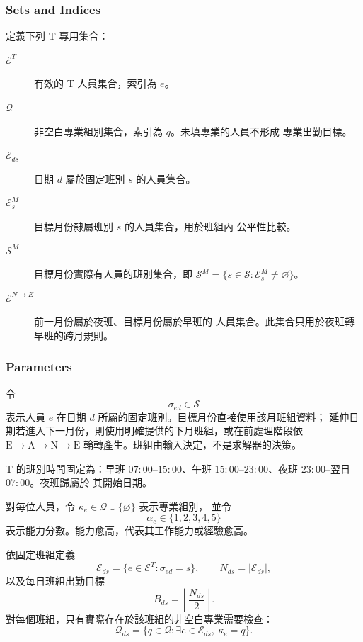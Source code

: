 \documentclass[12pt]{article}
\begin{document}
\subsubsection{Sets and Indices}

定義下列 T 專用集合：

\begin{description}
  \item[\(\mathcal{E}^{T}\)] 有效的 T 人員集合，索引為 \(e\)。

  \item[\(\mathcal{Q}\)] 非空白專業組別集合，索引為 \(q\)。未填專業的人員不形成
    專業出勤目標。

  \item[\(\mathcal{E}_{ds}\)] 日期 \(d\) 屬於固定班別 \(s\) 的人員集合。

  \item[\(\mathcal{E}^{M}_{s}\)] 目標月份隸屬班別 \(s\) 的人員集合，用於班組內
    公平性比較。

  \item[\(\mathcal{S}^{M}\)] 目標月份實際有人員的班別集合，即
    \(\mathcal{S}^{M}=\{s\in\mathcal{S}:\mathcal{E}^{M}_{s}\neq\varnothing\}\)。

  \item[\(\mathcal{E}^{N\rightarrow E}\)] 前一月份屬於夜班、目標月份屬於早班的
    人員集合。此集合只用於夜班轉早班的跨月規則。
\end{description}

\subsubsection{Parameters}

令
\[
  \sigma_{ed}\in\mathcal{S}
\]
表示人員 \(e\) 在日期 \(d\) 所屬的固定班別。目標月份直接使用該月班組資料；
延伸日期若進入下一月份，則使用明確提供的下月班組，或在前處理階段依
\(\mathrm{E}\rightarrow\mathrm{A}\rightarrow\mathrm{N}\rightarrow\mathrm{E}\)
輪轉產生。班組由輸入決定，不是求解器的決策。

T 的班別時間固定為：早班 \(07{:}00\)--\(15{:}00\)、午班
\(15{:}00\)--\(23{:}00\)、夜班 \(23{:}00\)--翌日 \(07{:}00\)。夜班歸屬於
其開始日期。

對每位人員，令 \(\kappa_e\in\mathcal{Q}\cup\{\varnothing\}\) 表示專業組別，
並令
\[
  \alpha_e\in\{1,2,3,4,5\}
\]
表示能力分數。能力愈高，代表其工作能力或經驗愈高。

依固定班組定義
\[
  \mathcal{E}_{ds}
  =
  \{e\in\mathcal{E}^{T}:\sigma_{ed}=s\},
  \qquad
  N_{ds}=|\mathcal{E}_{ds}|,
\]
以及每日班組出勤目標
\[
  B_{ds}=\left\lfloor\frac{N_{ds}}{2}\right\rfloor.
\]
對每個班組，只有實際存在於該班組的非空白專業需要檢查：
\[
  \mathcal{Q}_{ds}
  =
  \{q\in\mathcal{Q}:\exists e\in\mathcal{E}_{ds},\ \kappa_e=q\}.
\]
\end{document}
